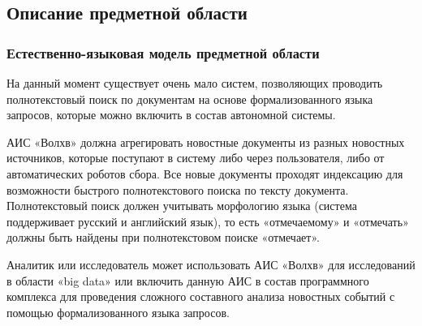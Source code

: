 \subsection{Описание предметной области}
\subsubsection{Естественно-языковая модель предметной области}

На данный момент существует очень мало систем, позволяющих проводить полнотекстовый поиск по документам на основе формализованного языка запросов, которые можно включить в состав автономной системы.

АИС «Волхв» должна агрегировать новостные документы из разных новостных источников, которые поступают в систему либо через пользователя, либо от автоматических роботов сбора. Все новые документы проходят индексацию для возможности быстрого полнотекстового поиска по тексту документа. Полнотекстовый поиск должен учитывать морфологию языка (система поддерживает русский и английский язык), то есть «отмечаемому» и «отмечать» должны быть найдены при полнотекстовом поиске «отмечает».

Аналитик или исследователь может использовать АИС «Волхв» для исследований в области «big data» или включить данную АИС в состав программного комплекса для проведения сложного составного анализа новостных событий с помощью формализованного языка запросов. 

